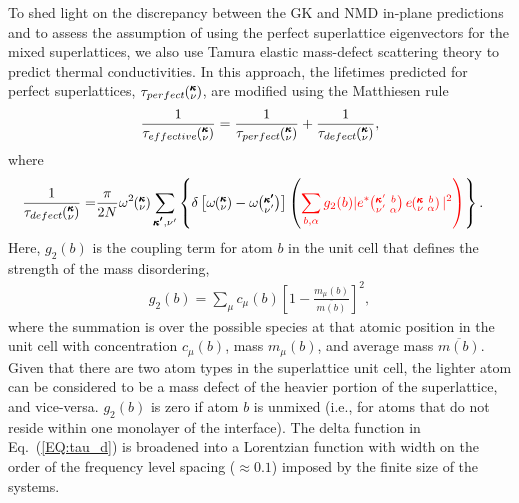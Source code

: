 \documentclass[aps,prb,preprint,preprintnumbers,amsmath,amssymb,floatfix,superscriptaddress]{revtex4}
\newcommand{\kvba}{\mspace{-4.0mu}\left(\mspace{-8.0mu}
\begin{smallmatrix} &\pmb{\kappa} &b \\ &\nu &\alpha\end{smallmatrix}
\mspace{-3.0mu}\right)}
\newcommand{\kvbap}{\mspace{-4.0mu}\left(\mspace{-8.0mu}
\begin{smallmatrix} &\pmb{\kappa}' &b \\ &\nu' &\alpha\end{smallmatrix}
\mspace{-3.0mu}\right)}
\newcommand{\kv}{\mspace{-4.0mu}\left(\mspace{-8.0mu}
\begin{smallmatrix}&\pmb{\kappa} \\&\nu\end{smallmatrix}
\mspace{-3.0mu}\right)}
\newcommand{\kvp}{\mspace{-4.0mu}\left(\mspace{-8.0mu}
\begin{smallmatrix}&\pmb{\kappa'} \\&\nu'\end{smallmatrix}
\mspace{-3.0mu}\right)}
\begin{document}
To shed light on the discrepancy between the GK and NMD in-plane predictions and to assess the assumption of using the perfect superlattice eigenvectors for the mixed superlattices, we also use Tamura elastic mass-defect scattering theory to predict thermal conductivities. \cite{tamura_isotope_1983,PhysRevB.87.140302,Luckyanova16112012} In this approach, the lifetimes predicted for perfect superlattices, $\tau_{perfect}\kv$, are modified using the Matthiesen rule 
\begin{equation}\label{EQ:tau_eff}
\begin{split}
\frac{1}{\tau_{effective}\kv} = \frac{1}{\tau_{perfect}\kv} +\frac{1}{\tau_{defect}\kv},
\end{split}
\end{equation}
where
\begin{equation}\label{EQ:tau_d}
\begin{split}
\frac{1}{\tau_{defect}\kv} = &\frac{\pi}{2N}\omega^2\kv \sum_{\pmb{\kappa'},\nu'} \left\{ \delta\left[ \omega\kv - \omega\kvp \right]
\left (\color{red} \sum_{b,\alpha} g_2(b) |e^*\kvbap e\kvba |^2 \right )\right \} .
\end{split}
\end{equation}
Here, $g_2(b)$ is the coupling term for atom $b$ in the unit cell that defines the strength of the mass disordering,
\begin{equation}\label{EQ:g(b)}
\begin{split}
g_2(b) = \sum_\mu c_{\mu}(b)\left[1-\frac{m_{\mu}(b)}{\overline{m(b)}}\right]^2, 
\end{split}
\end{equation}
where the summation is over the possible species at that atomic position in the unit cell with concentration $c_\mu(b)$, mass $m_\mu(b)$, and average mass $\overline{m(b)}$. Given that there are two atom types in the superlattice unit cell, the lighter atom can be considered to be a mass defect of the heavier portion of the superlattice, and vice-versa. $g_2(b)$ is zero if atom $b$ is unmixed (i.e., for atoms that do not reside within one monolayer of the interface). The delta function in Eq.~(\ref{EQ:tau_d}) is broadened into a Lorentzian function with width on the order of the frequency level spacing ($\approx 0.1$) imposed by the finite size of the systems.\cite{allen_thermal_1993}
\end{document}
